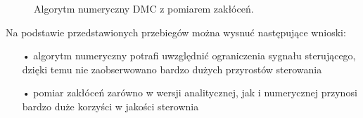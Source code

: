 \begin{figure}[h!]
\centering
{}
\hfill
{}
\caption{Algorytm numeryczny DMC z pomiarem zakłóceń.}
\end{figure}

Na podstawie przedstawionych przebiegów można wysnuć następujące wnioski:

\begin{itemize}
\item[•] algorytm numeryczny potrafi uwzględnić ograniczenia sygnału sterującego, dzięki temu nie zaobserwowano bardzo dużych przyrostów sterowania
\item[•] pomiar zakłóceń zarówno w wersji analitycznej, jak i numerycznej przynosi bardzo duże korzyści w jakości sterownia 
\end{itemize}